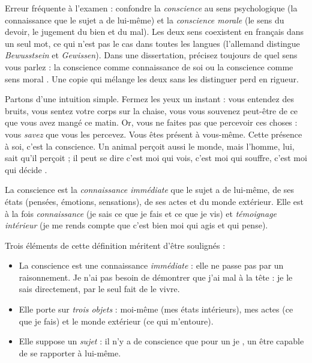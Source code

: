 \documentclass[11pt]{article}
\newcommand{\cle}[1]{{\popxbold\color{popdark}#1}}
\newcounter{popsec}
\newcounter{popsub}
\newcommand{\courssub}[1]{%
  \stepcounter{popsub}%
  \par\vspace{9pt}\noindent{\popxbold\fontsize{11.5}{13}\selectfont\color{popink}{\color{poporange}\thepopsec.\thepopsub}\hspace{6pt}#1}\par\nopagebreak\vspace{4pt}
}
\begin{document}
\begin{attention}
Erreur fréquente à l'examen : confondre la \emph{conscience} au sens psychologique (la connaissance que le sujet a de lui-même) et la \emph{conscience morale} (le sens du devoir, le jugement du bien et du mal). Les deux sens coexistent en français dans un seul mot, ce qui n'est pas le cas dans toutes les langues (l'allemand distingue \emph{Bewusstsein} et \emph{Gewissen}). Dans une dissertation, précisez toujours de quel sens vous parlez : \og la conscience comme connaissance de soi \fg{} ou \og la conscience comme sens moral \fg{}. Une copie qui mélange les deux sans les distinguer perd en rigueur.
\end{attention}

\courssub{Définition générale de la conscience}

Partons d'une intuition simple. Fermez les yeux un instant : vous entendez des bruits, vous sentez votre corps sur la chaise, vous vous souvenez peut-être de ce que vous avez mangé ce matin. Or, vous ne faites pas que percevoir ces choses : vous \emph{savez} que vous les percevez. Vous êtes présent à vous-même. Cette présence à soi, c'est la conscience. Un animal perçoit aussi le monde, mais l'homme, lui, sait qu'il perçoit ; il peut se dire \og c'est moi qui vois, c'est moi qui souffre, c'est moi qui décide \fg{}.

\begin{definition}[La conscience]
La \cle{conscience} est la \emph{connaissance immédiate} que le sujet a de lui-même, de ses états (pensées, émotions, sensations), de ses actes et du monde extérieur. Elle est à la fois \emph{connaissance} (je sais ce que je fais et ce que je vis) et \emph{témoignage intérieur} (je me rends compte que c'est bien moi qui agis et qui pense).
\end{definition}

Trois éléments de cette définition méritent d'être soulignés :

\begin{itemize}
\item La conscience est une connaissance \emph{immédiate} : elle ne passe pas par un raisonnement. Je n'ai pas besoin de démontrer que j'ai mal à la tête : je le sais directement, par le seul fait de le vivre.
\item Elle porte sur \emph{trois objets} : moi-même (mes états intérieurs), mes actes (ce que je fais) et le monde extérieur (ce qui m'entoure).
\item Elle suppose un \emph{sujet} : il n'y a de conscience que pour un \og je \fg{}, un être capable de se rapporter à lui-même.
\end{itemize}
\end{document}
